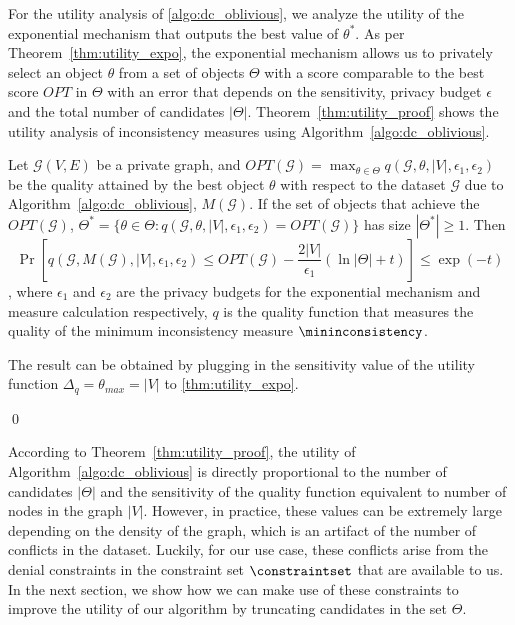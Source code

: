 For the utility analysis of \cref{algo:dc_oblivious}, we analyze the utility of the exponential mechanism that outputs the best value of $\theta^*$. As per Theorem~\ref{thm:utility_expo}, the exponential mechanism allows us to privately select an object $\theta$ from a set of objects $\Theta$ with a score comparable to the best score $OPT$ in $\Theta$ with an error that depends on the sensitivity, privacy budget $\epsilon$ and the total number of candidates $|\Theta|$. Theorem~\ref{thm:utility_proof} shows the utility analysis of inconsistency measures using Algorithm~\ref{algo:dc_oblivious}. 


\begin{theorem}\label{thm:utility_proof}
Let $\mathcal{G}(V, E)$ be a private graph, and $OPT(\mathcal{G})=\max _{\theta \in \Theta} q(\mathcal{G}, \theta, |V|, \epsilon_1, \epsilon_2)$ be the quality attained by the best object $\theta$ with respect to the dataset $\mathcal{G}$ due to Algorithm~\ref{algo:dc_oblivious}, $M(\mathcal{G})$. If the set of objects that achieve the $OPT(\mathcal{G})$, $\Theta^*=\{\theta \in \Theta: q(\mathcal{G}, \theta, |V|, \epsilon_1, \epsilon_2)=OPT(\mathcal{G})\}$ has size $|\Theta^*| \geq 1$. Then
$$ \Pr \left[q(\mathcal{G}, M(\mathcal{G}), |V|, \epsilon_1, \epsilon_2) \leq OPT (\mathcal{G}) - \frac{2|V|}{\epsilon_1} (\ln |\Theta| + t) \right] \leq \exp(-t)$$,
where $\epsilon_1$ and $\epsilon_2$ are the privacy budgets for the exponential mechanism and measure calculation respectively, $q$ is the quality function that measures the quality of the minimum inconsistency measure $\mininconsistency$.
\end{theorem}


\proof

The result can be obtained by plugging in the sensitivity value of the utility function $\Delta_q = \theta_{max} = |V| $ to \cref{thm:utility_expo}. 

\qed

According to Theorem~\ref{thm:utility_proof}, the utility of Algorithm~\ref{algo:dc_oblivious} is directly proportional to the number of candidates $|\Theta|$ and the sensitivity of the quality function equivalent to number of nodes in the graph $|V|$. However, in practice, these values can be extremely large depending on the density of the graph, which is an artifact of the number of conflicts in the dataset. Luckily, for our use case, these conflicts arise from the denial constraints in the constraint set $\constraintset$ that are available to us. In the next section, we show how we can make use of these constraints to improve the utility of our algorithm by truncating candidates in the set $\Theta$.

